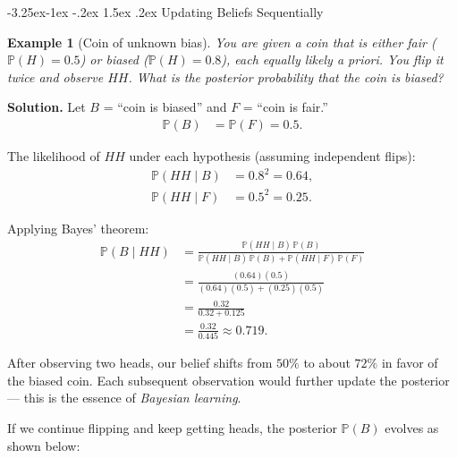 \documentclass{article}
\makeatletter
\newtheorem{example}{Example}[section]
\theoremstyle{remark}
\newlength{\subsecindent}
\renewcommand\subsection{\@startsection{subsection}{2}{\subsecindent}%
  {-3.25ex\@plus -1ex \@minus -.2ex}%
  {1.5ex \@plus .2ex}%
  {\normalfont\large\bfseries}}
\newenvironment{sub}{%
  \begin{list}{}{%
    \setlength{\leftmargin}{4em}%
    \setlength{\rightmargin}{0pt}%
    \setlength{\topsep}{0pt}%
    \setlength{\partopsep}{0pt}%
    \setlength{\parsep}{\parskip}%
    \setlength{\itemsep}{\parskip}%
  }\item\relax
}{\end{list}}
\newcommand{\Prob}{\mathbb{P}}
\newcommand{\given}{\mid}
\makeatother
\begin{document}
\subsection{Updating Beliefs Sequentially}
\label{sec:sequential}
\begin{sub}

\begin{example}[Coin of unknown bias]
  \label{ex:coin}
  You are given a coin that is either fair ($\Prob(H) = 0.5$) or biased
  ($\Prob(H) = 0.8$), each equally likely \emph{a priori}.
  You flip it twice and observe $HH$.
  What is the posterior probability that the coin is biased?
\end{example}

\textbf{Solution.}
Let $B$ = ``coin is biased'' and $F$ = ``coin is fair.''
\begin{align*}
  \Prob(B) &= \Prob(F) = 0.5.
\end{align*}

The likelihood of $HH$ under each hypothesis (assuming independent flips):
\begin{align*}
  \Prob(HH \given B) &= 0.8^2 = 0.64, \\
  \Prob(HH \given F) &= 0.5^2 = 0.25.
\end{align*}

Applying Bayes' theorem:
\begin{align*}
  \Prob(B \given HH)
    &= \frac{\Prob(HH \given B)\,\Prob(B)}
            {\Prob(HH \given B)\,\Prob(B) + \Prob(HH \given F)\,\Prob(F)} \\[6pt]
    &= \frac{(0.64)(0.5)}{(0.64)(0.5) + (0.25)(0.5)} \\[6pt]
    &= \frac{0.32}{0.32 + 0.125} \\[6pt]
    &= \frac{0.32}{0.445}
     \approx \boxed{0.719}.
\end{align*}

After observing two heads, our belief shifts from $50\%$ to about $72\%$
in favor of the biased coin. Each subsequent observation would further
update the posterior --- this is the essence of \emph{Bayesian learning}.

If we continue flipping and keep getting heads, the posterior
$\Prob(B)$ evolves as shown below:

\begin{figure}[h]
  \centering
\end{figure}
\end{sub}
\end{document}
